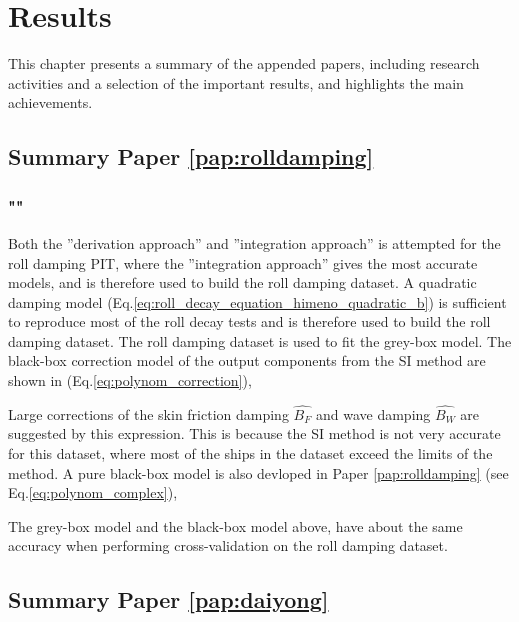 \chapter{Results\label{ch:results}}
This chapter presents a summary of the appended papers, including research activities
and a selection of the important results, and highlights the main achievements.

\section{Summary Paper \ref{pap:rolldamping}}
\subsection*{""}
Both the ''derivation approach'' and ''integration approach'' is attempted for the roll damping PIT, where the ''integration approach'' gives the most accurate models, and is therefore used to build the roll damping dataset. A quadratic damping model (Eq.\ref{eq:roll_decay_equation_himeno_quadratic_b}) is sufficient to reproduce most of the roll decay tests and is therefore used to build the roll damping dataset. 
The roll damping dataset is used to fit the grey-box model. The black-box correction model of the output components from the SI method are shown in (Eq.\ref{eq:polynom_correction}),


\noindent Large corrections of the skin friction damping $\hat{B_F}$ and wave damping $\hat{B_W}$ are suggested by this expression. This is because the SI method is not very accurate for this dataset, where most of the ships in the dataset exceed the limits of the method. A pure black-box model is also devloped in Paper \ref{pap:rolldamping} (see Eq.\ref{eq:polynom_complex}),


\noindent The grey-box model and the black-box model above, have about the same accuracy when performing cross-validation on the roll damping dataset.

\section{Summary Paper \ref{pap:daiyong}}
